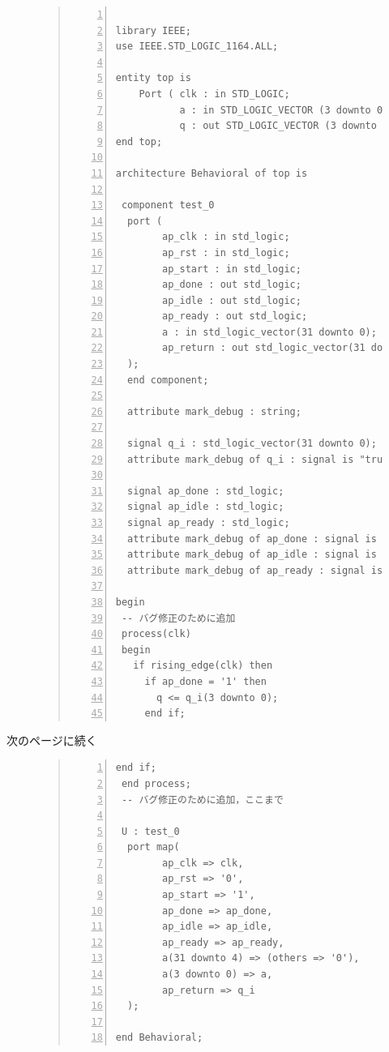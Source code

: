\documentclass[a4paper,dvipdfmx]{jsarticle}
\begin{document}
\begin{figure}[H]
\begin{quote}
\begin{Verbatim}[frame=single, numbers=left, baselinestretch=0.8]

library IEEE;
use IEEE.STD_LOGIC_1164.ALL;

entity top is
    Port ( clk : in STD_LOGIC;
           a : in STD_LOGIC_VECTOR (3 downto 0);
           q : out STD_LOGIC_VECTOR (3 downto 0));
end top;

architecture Behavioral of top is

 component test_0
  port (
        ap_clk : in std_logic;
        ap_rst : in std_logic;
        ap_start : in std_logic;
        ap_done : out std_logic;
        ap_idle : out std_logic;
        ap_ready : out std_logic;
        a : in std_logic_vector(31 downto 0);
        ap_return : out std_logic_vector(31 downto 0)
  );
  end component;
  
  attribute mark_debug : string;
  
  signal q_i : std_logic_vector(31 downto 0);
  attribute mark_debug of q_i : signal is "true";
  
  signal ap_done : std_logic;
  signal ap_idle : std_logic;
  signal ap_ready : std_logic;
  attribute mark_debug of ap_done : signal is "true";
  attribute mark_debug of ap_idle : signal is "true";
  attribute mark_debug of ap_ready : signal is "true";
  
begin
 -- バグ修正のために追加
 process(clk)
 begin
   if rising_edge(clk) then
     if ap_done = '1' then
       q <= q_i(3 downto 0);
     end if;
  \end{Verbatim}
 \end{quote}
\end{figure}
次のページに続く
\begin{figure}[H]
\begin{quote}
\begin{Verbatim}[frame=single, numbers=left, baselinestretch=0.8]
   end if;
 end process;
 -- バグ修正のために追加，ここまで

 U : test_0
  port map(
        ap_clk => clk,
        ap_rst => '0',
        ap_start => '1',
        ap_done => ap_done,
        ap_idle => ap_idle,
        ap_ready => ap_ready,
        a(31 downto 4) => (others => '0'),
        a(3 downto 0) => a,
        ap_return => q_i
  );

end Behavioral;
  \end{Verbatim}
 \end{quote}
\end{figure}
\end{document}
